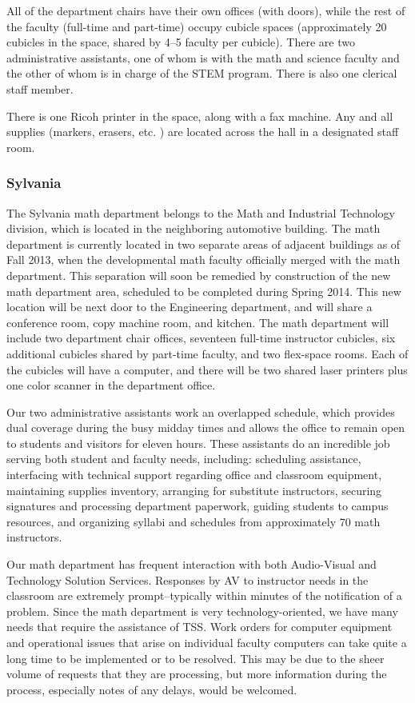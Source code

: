 All of the department chairs have their own offices (with doors), while the rest of the faculty (full-time and part-time) occupy cubicle spaces (approximately 20 cubicles in the space, shared by 4--5 faculty per cubicle).
There are two administrative assistants, one of whom is with the math and science faculty and the other of whom is in charge of the STEM program.
There is also one clerical staff member.

There is one Ricoh printer in the space, along with a fax machine.
Any and all supplies (markers, erasers, etc.
) are located across the hall in a designated
staff room.

\subsubsection{Sylvania}
The Sylvania math department belongs to the Math and Industrial Technology division, which is located in the neighboring automotive building.
The math department is currently located in two separate areas of adjacent buildings as of Fall 2013, when the developmental math faculty officially merged with the math department.
This separation will soon be remedied by construction of the new math department area, scheduled to be completed during Spring 2014.
This new location will be next door to the Engineering department, and will share a conference room, copy machine room, and kitchen.
The math department will include two department chair offices, seventeen full-time instructor cubicles, six additional cubicles shared by part-time faculty, and two flex-space rooms.
Each of the cubicles will have a computer, and there will be two shared laser printers plus one color scanner in the department office.

Our two administrative assistants work an overlapped schedule, which provides dual coverage during the busy midday times and allows the office to remain open to students and visitors for eleven hours.
These assistants do an incredible job serving both student and faculty needs, including:  scheduling assistance, interfacing with technical support regarding office and classroom equipment, maintaining supplies inventory, arranging for substitute instructors, securing signatures and processing department paperwork, guiding students to campus resources, and organizing syllabi and schedules from approximately 70 math instructors.

Our math department has frequent interaction with both Audio-Visual and Technology Solution Services.
Responses by AV to instructor needs in the classroom are extremely prompt--typically within minutes of the notification of a problem.
Since the math department is very technology-oriented, we have many needs that require the assistance of TSS.
Work orders for computer equipment and operational issues that arise on individual faculty computers can take quite a long time to be implemented or to be resolved.
This may be due to the sheer volume of requests that they are processing, but more information during the process, especially notes of any delays, would be welcomed.

